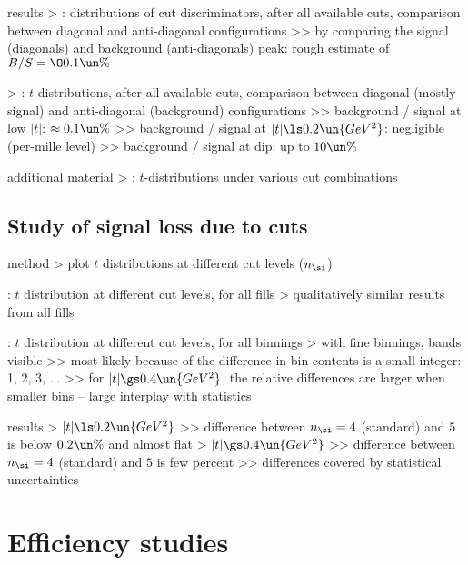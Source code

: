 \> results
\>> : distributions of cut discriminators, after all available cuts, comparison between diagonal and anti-diagonal configurations
\>>> by comparing the signal (diagonals) and background (anti-diagonals) peak: rough estimate of $B/S = \O{0.1\un{\%}}$

\>> : $t$-distributions, after all available cuts, comparison between diagonal (mostly signal) and anti-diagonal (background) configurations
\>>> background / signal at low $|t|$: $\approx 0.1\un{\%}$
\>>> background / signal at $|t| \ls 0.2\un{GeV^2}$: negligible (per-mille level)
\>>> background / signal at dip: up to $10\un{\%}$


\> additional material
\>> : $t$-distributions under various cut combinations

\subsection{Study of signal loss due to cuts}

\> method
\>> plot $t$ distributions at different cut levels ($n_\si$)

\> : $t$ distribution at different cut levels, for all fills
\>> qualitatively similar results from all fills

\> : $t$ distribution at different cut levels, for all binnings
\>> with fine binnings, bands visible
\>>> most likely because of the difference in bin contents is a small integer: 1, 2, 3, ...
\>>> for $|t| \gs 0.4\un{GeV^2}$, the relative differences are larger when smaller bins -- large interplay with statistics

\> results
\>> $|t| \ls 0.2\un{GeV^2}$
\>>> difference between $n_\si = 4$ (standard) and $5$ is below $0.2\un{\%}$ and almost flat
\>> $|t| \gs 0.4\un{GeV^2}$
\>>> difference between $n_\si = 4$ (standard) and $5$ is few percent
\>>> differences covered by statistical uncertainties

\section{Efficiency studies}


